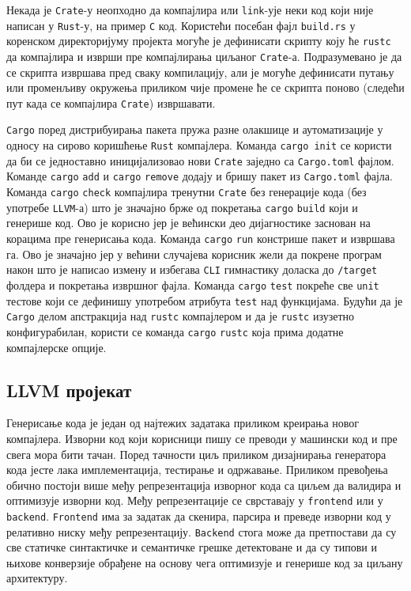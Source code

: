Некада је \verb|Crate|-у неопходно да компајлира или \verb|link|-ује неки код који није написан у \verb|Rust|-у, на пример \verb|C| код. Користећи посебан фајл \verb|build.rs| у коренском директоријуму 
пројекта могуће је дефинисати скрипту коју ће \verb|rustc| да компајлира и изврши пре компајлирања циљаног \verb|Crate|-а. Подразумевано је да се скрипта извршава пред сваку компилацију,
али је могуће дефинисати путању или променљиву окружења приликом чије промене ће се скрипта поново (следећи пут када се компајлира \verb|Crate|) извршавати.

\verb|Cargo| поред дистрибуирања пакета пружа разне олакшице и аутоматизације у односу на сирово коришћење \verb|Rust| компајлера. 
Команда \verb|cargo init| се користи да би се једноставно иницијализовао нови \verb|Crate| заједно са \verb|Cargo.toml| фајлом. 
Команде \verb|cargo| \verb|add| и \verb|cargo| \verb|remove| додају и бришу пакет из \verb|Cargo.toml| фајла.
Команда \verb|cargo| \verb|check| компајлира тренутни \verb|Crate| без генерације кода (без употребе \verb|LLVM|-а) што је значајно брже 
од покретања \verb|cargo| \verb|build| који и генерише код. Ово је корисно јер је већински део дијагностике заснован 
на корацима пре генерисања кода. Команда \verb|cargo| \verb|run| констрише пакет и извршава га. Ово је значајно јер у већини случајева корисник жели да покрене програм након што је 
написао измену и избегава \verb|CLI| гимнастику доласка до \verb|/target| фолдера и покретања извршног фајла. 
Команда \verb|cargo| \verb|test| покреће све \verb|unit| тестове који се дефинишу употребом атрибута \verb|test| над функцијама.
Будући да је \verb|Cargo| делом апстракција над \verb|rustc| компајлером и да је \verb|rustc| изузетно конфигурабилан, користи се команда \verb|cargo| \verb|rustc|
која прима додатне компајлерске опције.

\newpage

\subsection{LLVM пројекат}

Генерисање кода је један од најтежих задатака приликом креирања новог компајлера. Изворни код који 
корисници пишу се преводи у машински код и пре свега мора бити тачан. Поред тачности циљ приликом 
дизајнирања генератора кода јесте лака имплементација, тестирање и одржавање.
Приликом превођења обично постоји 
више међу репрезентација изворног кода са циљем да валидира и оптимизује изворни код. Међу репрезентације 
се сврставају у \verb|frontend| или у \verb|backend|. \verb|Frontend| има за задатак да скенира, парсира 
и преведе изворни код у релативно ниску међу репрезентацију. \verb|Backend| стога може да претпостави 
да су све статичке синтактичке и семантичке грешке детектоване и да су типови и њихове конверзије
обрађене на основу чега оптимизује и генерише код за циљану архитектуру.

